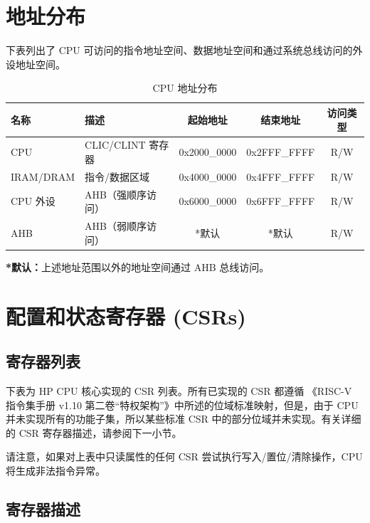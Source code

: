 \documentclass[main\_\_CN.tex]{subfiles}
\begin{document}
\section{地址分布}

下表列出了 CPU 可访问的指令地址空间、数据地址空间和通过系统总线访问的外设地址空间。
\begin{longtable}{| l| l |c | c | c  |}
\caption{CPU 地址分布} \label{tab:riscvcpu-mem-blocks}
\\ \hline
\rowcolor{lightgray}
\textbf{名称} & \textbf{描述}    & \textbf{起始地址}  & \textbf{结束地址}  & \textbf{访问类型}   \\ \hline
CPU \label{cpu} &  CLIC/CLINT 寄存器 &      0x2000\_0000  &  0x2FFF\_FFFF  &  R/W  \\ \hline
IRAM/DRAM\label{ram} & 指令/数据区域 &   0x4000\_0000  &  0x4FFF\_FFFF  &  R/W  \\ \hline
CPU 外设 \label{cpu_peri} & AHB（强顺序访问） &      0x6000\_0000  &  0x6FFF\_FFFF  &  R/W  \\ \hline
AHB\label{sysahb} & AHB（弱顺序访问） &      *默认  &  *默认  &  R/W  \\ \hline
\end{longtable}

\textbf{*默认：}上述地址范围以外的地址空间通过 AHB 总线访问。


\section{配置和状态寄存器 (CSRs)}
\hypertarget{riscvcpu-cpu-reg-summ}{}
\subsection{寄存器列表}
\label{sec:riscvcpu-cpu-reg-summ}

下表为 HP CPU 核心实现的 CSR 列表。所有已实现的 CSR 都遵循 《RISC-V 指令集手册 v1.10 第二卷“特权架构”》中所述的位域标准映射，但是，由于 CPU 并未实现所有的功能子集，所以某些标准 CSR 中的部分位域并未实现。有关详细的 CSR 寄存器描述，请参阅下一小节。


请注意，如果对上表中只读属性的任何 CSR 尝试执行写入/置位/清除操作，CPU 将生成非法指令异常。
\subsection{寄存器描述}
\end{document}
